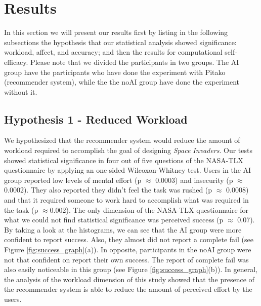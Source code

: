 \documentclass[letterpaper]{article} %
\begin{document}
\section{Results}

In this section we will present our results first by listing in the following subsections the hypothesis that our statistical analysis showed significance: workload, affect, and accuracy; and then the results for computational self-efficacy. Please note that we divided the participants in two groups. The AI group have the participants who have done the experiment with Pitako (recommender system), while the the noAI group have done the experiment without it.

\subsection{Hypothesis 1 - Reduced Workload}

We hypothesized that the recommender system would reduce the amount of workload required to accomplish the goal of designing \textit{Space Invaders}. Our tests showed statistical significance in four out of five questions of the NASA-TLX questionnaire by applying an one sided Wilcoxon-Whitney test. Users in the AI group reported low levels of mental effort (p $\approx$ 0.0003) and insecurity (p $\approx$ 0.0002). They also reported they didn't feel the task was rushed (p $\approx$ 0.0008) and that it required someone to work hard to accomplish what was required in the task (p $\approx 0.002$). The only dimension of the NASA-TLX questionnaire for what we could not find statistical significance was perceived success (p $\approx$ 0.07). By taking a look at the histograms, we can see that the AI group were more confident to report success. Also, they almost did not report a complete fail (see Figure \ref{fig:success_graph}(a)). In opposite, participants in the noAI group were not that confident on report their own success. The report of complete fail was also easily noticeable in this group (see Figure \ref{fig:success_graph}(b)). In general, the analysis of the workload dimension of this study showed that the presence of the recommender system is able to reduce the amount of perceived effort by the users.
\end{document}
